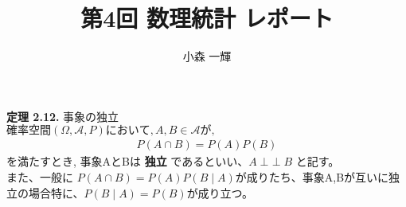\documentclass[dvipdfmx,10pt, a4j]{jarticle}
\title{第4回 数理統計 レポート}
\author{小森 一輝}
\newcommand{\indepe}{\mathop{\perp\!\!\!\perp}}
\theoremstyle{definition}
\begin{document}
    \maketitle

    \setcounter{section}{2}
    \noindent
    \textbf{定理 2.12.} 事象の独立\\
    $確率空間(\Omega, \mathcal{A}, P) において, A, B \in \mathcal{A}が,$\\
    \begin{align*}
        P(A \cap B) = P(A)P(B)
    \end{align*}
    を満たすとき, 事象AとBは \textbf{独立} であるといい、$A \indepe B$ と記す。\\
    また、一般に $P(A \cap B) = P(A)P(B \mid A)$が成りたち、事象A,Bが互いに独立の場合特に、$P(B \mid A) = P(B)$が成り立つ。\\
\end{document}
